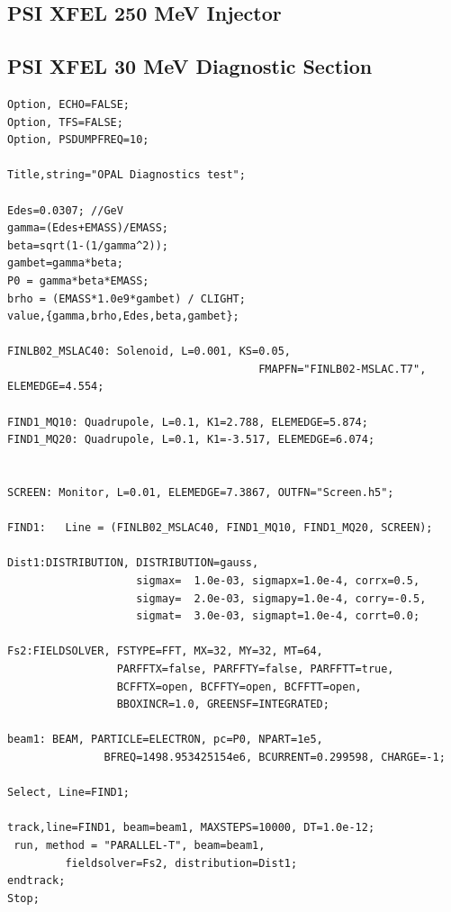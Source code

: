 \subsection{PSI XFEL 250 MeV Injector}
\label{sec:felinj}
\clearpage

\subsection{PSI XFEL 30 MeV Diagnostic Section}
\label{sec:feldiagsec1}
\begin{verbatim}
Option, ECHO=FALSE;
Option, TFS=FALSE;
Option, PSDUMPFREQ=10;

Title,string="OPAL Diagnostics test";

Edes=0.0307; //GeV
gamma=(Edes+EMASS)/EMASS;
beta=sqrt(1-(1/gamma^2));
gambet=gamma*beta;
P0 = gamma*beta*EMASS;
brho = (EMASS*1.0e9*gambet) / CLIGHT;
value,{gamma,brho,Edes,beta,gambet};

FINLB02_MSLAC40: Solenoid, L=0.001, KS=0.05, 
                                       FMAPFN="FINLB02-MSLAC.T7", ELEMEDGE=4.554;

FIND1_MQ10: Quadrupole, L=0.1, K1=2.788, ELEMEDGE=5.874;
FIND1_MQ20: Quadrupole, L=0.1, K1=-3.517, ELEMEDGE=6.074;


SCREEN: Monitor, L=0.01, ELEMEDGE=7.3867, OUTFN="Screen.h5";

FIND1:   Line = (FINLB02_MSLAC40, FIND1_MQ10, FIND1_MQ20, SCREEN);

Dist1:DISTRIBUTION, DISTRIBUTION=gauss,
                    sigmax=  1.0e-03, sigmapx=1.0e-4, corrx=0.5,
                    sigmay=  2.0e-03, sigmapy=1.0e-4, corry=-0.5,
                    sigmat=  3.0e-03, sigmapt=1.0e-4, corrt=0.0;

Fs2:FIELDSOLVER, FSTYPE=FFT, MX=32, MY=32, MT=64, 
                 PARFFTX=false, PARFFTY=false, PARFFTT=true,
                 BCFFTX=open, BCFFTY=open, BCFFTT=open,
                 BBOXINCR=1.0, GREENSF=INTEGRATED;

beam1: BEAM, PARTICLE=ELECTRON, pc=P0, NPART=1e5, 
               BFREQ=1498.953425154e6, BCURRENT=0.299598, CHARGE=-1;

Select, Line=FIND1;

track,line=FIND1, beam=beam1, MAXSTEPS=10000, DT=1.0e-12;
 run, method = "PARALLEL-T", beam=beam1, 
         fieldsolver=Fs2, distribution=Dist1;
endtrack;
Stop;
\end{verbatim}



